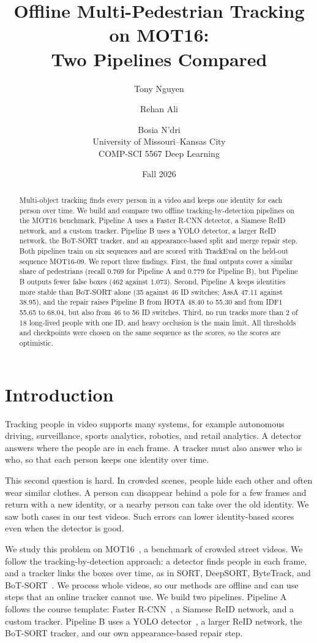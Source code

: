 \documentclass[11pt,letterpaper]{article}
\title{Offline Multi-Pedestrian Tracking on MOT16:\\
Two Pipelines Compared}
\author{Tony Nguyen \and Rehan Ali \and Bosia N'dri\\
University of Missouri--Kansas City\\
COMP-SCI 5567 Deep Learning}
\date{Fall 2026}
\begin{document}
\maketitle

\begin{abstract}
Multi-object tracking finds every person in a video and keeps one identity for each person over time.
We build and compare two offline tracking-by-detection pipelines on the MOT16 benchmark.
Pipeline A uses a Faster R-CNN detector, a Siamese ReID network, and a custom tracker.
Pipeline B uses a YOLO detector, a larger ReID network, the BoT-SORT tracker, and an appearance-based split and merge repair step.
Both pipelines train on six sequences and are scored with TrackEval on the held-out sequence MOT16-09.
We report three findings.
First, the final outputs cover a similar share of pedestrians (recall 0.769 for Pipeline A and 0.779 for Pipeline B), but Pipeline B outputs fewer false boxes (462 against 1,073).
Second, Pipeline A keeps identities more stable than BoT-SORT alone (35 against 46 ID switches; AssA 47.11 against 38.95), and the repair raises Pipeline B from HOTA 48.40 to 55.30 and from IDF1 55.65 to 68.04, but also from 46 to 56 ID switches.
Third, no run tracks more than 2 of 18 long-lived people with one ID, and heavy occlusion is the main limit.
All thresholds and checkpoints were chosen on the same sequence as the scores, so the scores are optimistic.
\end{abstract}

\section{Introduction}
Tracking people in video supports many systems, for example autonomous driving, surveillance, sports analytics, robotics, and retail analytics.
A detector answers where the people are in each frame.
A tracker must also answer who is who, so that each person keeps one identity over time.

This second question is hard.
In crowded scenes, people hide each other and often wear similar clothes.
A person can disappear behind a pole for a few frames and return with a new identity, or a nearby person can take over the old identity.
We saw both cases in our test videos.
Such errors can lower identity-based scores even when the detector is good.

We study this problem on MOT16~\cite{milan2016mot16}, a benchmark of crowded street videos.
We follow the tracking-by-detection approach: a detector finds people in each frame, and a tracker links the boxes over time, as in SORT, DeepSORT, ByteTrack, and BoT-SORT~\cite{bewley2016sort,wojke2017deepsort,zhang2022bytetrack,aharon2022botsort}.
We process whole videos, so our methods are offline and can use steps that an online tracker cannot use.
We build two pipelines.
Pipeline A follows the course template: Faster R-CNN~\cite{ren2015faster}, a Siamese ReID network, and a custom tracker.
Pipeline B uses a YOLO detector~\cite{redmon2016yolo}, a larger ReID network, the BoT-SORT tracker, and our own appearance-based repair step.
\end{document}
